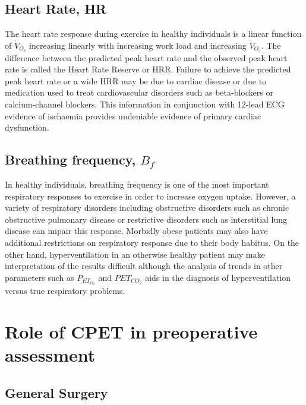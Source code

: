 \subsection{Heart Rate, HR}
\label{sec:heart_rate}
The heart rate response during exercise in healthy individuals is a linear function of $\dot{V}_{O_2}$ increasing linearly with increasing work load and increasing $\dot{V}_{O_2}$. The difference between the predicted peak heart rate and the observed peak heart rate is called the Heart Rate Reserve or HRR. Failure to achieve the predicted peak heart rate or a wide HRR may be due to cardiac disease or due to medication used to treat cardiovascular disorders such as beta-blockers or calcium-channel blockers. This information in conjunction with 12-lead ECG evidence of ischaemia provides undeniable evidence of primary cardiac dysfunction.

\subsection{Breathing frequency, $B_f$}
In healthy individuals, breathing frequency is one of the most important respiratory responses to exercise in order to increase oxygen uptake. However, a variety of respiratory disorders including obstructive disorders such as chronic obstructive pulmonary disease or restrictive disorders such as interstitial lung disease can impair this response. Morbidly obese patients may also have additional restrictions on respiratory response due to their body habitus. On the other hand, hyperventilation in an otherwise healthy patient may make interpretation of the results difficult although the analysis of trends in other parameters such as $P_{ET_{O_2}}$ and $P{ET_{CO_2}}$ aids in the diagnosis of hyperventilation versus true respiratory problems.

\section{Role of CPET in preoperative assessment}
\label{sec:cpx_roleInAssessment}
\subsection{General Surgery}

